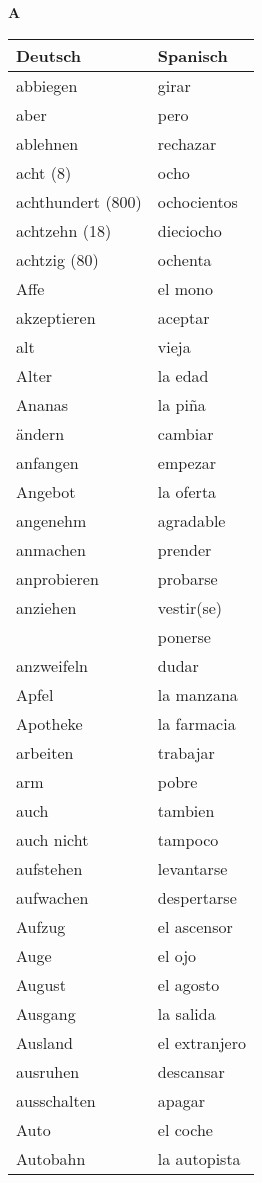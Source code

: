 \begin{flushright}\begin{Huge}\textbf{A}\end{Huge}\end{flushright}

\begin{longtable}{p{} p{}} 
\textbf{Deutsch}     & \textbf{Spanisch}                                       \\ \hline
\hline
\endhead %
abbiegen & girar\\
aber & pero\\
ablehnen & rechazar\\
acht (8) & ocho\\
achthundert (800) & ochocientos\\
achtzehn (18) & dieciocho\\
achtzig (80) & ochenta\\
Affe & el mono\\
akzeptieren & aceptar\\
alt & vieja\\
Alter & la edad\\
Ananas & la piña\\
ändern & cambiar\\
anfangen & empezar\\
Angebot & la oferta \\
angenehm & agradable\\
anmachen & prender\\
anprobieren & probarse\\
anziehen & vestir(se)\\
~ & ponerse\\
anzweifeln & dudar\\
Apfel & la manzana \\
Apotheke & la farmacia\\
arbeiten & trabajar\\
arm & pobre\\
auch & tambien\\
auch nicht & tampoco\\
aufstehen & levantarse\\
aufwachen & despertarse\\
Aufzug & el ascensor\\
Auge & el ojo\\
August & el agosto\\
Ausgang & la salida\\
Ausland & el extranjero\\
ausruhen & descansar\\
ausschalten & apagar\\
Auto & el coche \\
Autobahn & la autopista\\
\end{longtable}
